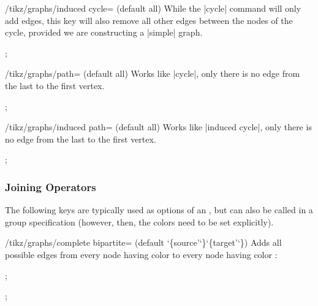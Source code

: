 \begin{key}{/tikz/graphs/induced cycle= (default all)}
    While the |cycle| command will only add edges, this key will also remove
    all other edges between the nodes of the cycle, provided we are
    constructing a |simple| graph.
\begin{codeexample}[]
\tikz {};
\end{codeexample}
\end{key}

\begin{key}{/tikz/graphs/path= (default all)}
    Works like |cycle|, only there is no edge from the last to the first
    vertex.
\begin{codeexample}[]
\tikz {};
\end{codeexample}
\end{key}

\begin{key}{/tikz/graphs/induced path= (default all)}
    Works like |induced cycle|, only there is no edge from the last to the
    first vertex.
\begin{codeexample}[]
\tikz {};
\end{codeexample}
\end{key}


\subsubsection{Joining Operators}

The following keys are typically used as options of an , but can also be called in a group specification (however, then,
the colors need to be set explicitly).

\begin{key}{/tikz/graphs/complete bipartite= (default \char`\{source'\char`\}\char`\{target'\char`\})}
    Adds all possible edges from every node having color  to
    every node having color :
\begin{codeexample}[]
\tikz {};
\end{codeexample}
\begin{codeexample}[]
\tikz {};
\end{codeexample}
\end{key}

